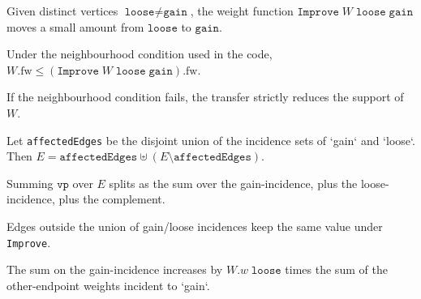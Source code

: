 \begin{definition}\label{def:Improve}
Given distinct vertices $\texttt{loose}\ne\texttt{gain}$, the weight function $\texttt{Improve}\;W\;\texttt{loose}\;\texttt{gain}$ moves a small amount from $\texttt{loose}$ to $\texttt{gain}$.
\end{definition}

\begin{lemma}\label{lem:Improve_total_weight_nondec}
Under the neighbourhood condition used in the code, $W.\mathrm{fw}\le (\texttt{Improve}\;W\;\texttt{loose}\;\texttt{gain}).\mathrm{fw}$.
\end{lemma}

\begin{lemma}\label{lem:Improve_support_strictly_reduced}
If the neighbourhood condition fails, the transfer strictly reduces the support of $W$.
\end{lemma}

\begin{lemma}\label{lem:Improve_edgeFinset_partition}
Let \texttt{affectedEdges} be the disjoint union of the incidence sets of `gain` and `loose`. Then
\(E = \texttt{affectedEdges} \uplus (E \setminus \texttt{affectedEdges})\).
\end{lemma}

\begin{lemma}\label{lem:Improve_partition_sum_split}
Summing \(\texttt{vp}\) over \(E\) splits as the sum over the gain-incidence, plus the loose-incidence, plus the complement.
\end{lemma}

\begin{lemma}\label{lem:Improve_unchanged_edge_sum}
Edges outside the union of gain/loose incidences keep the same value under \texttt{Improve}.
\end{lemma}

\begin{lemma}\label{lem:Improve_gain_contribution_increase}
The sum on the gain-incidence increases by \(W.w\;\texttt{loose}\) times the sum of the other-endpoint weights incident to `gain`.
\end{lemma}

